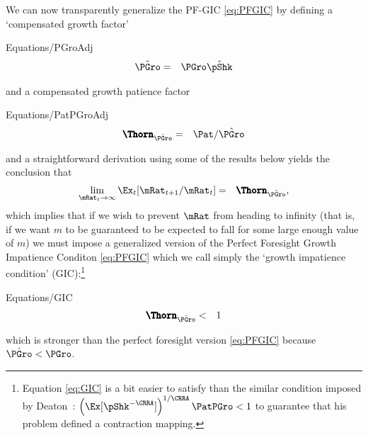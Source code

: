 \documentclass[titlepage]{\econtex}\providecommand{\texname}{BufferStockTheory}%
\providecommand{\EqDir}{Equations}
\begin{document}
\hypertarget{GIC}{}
We can now transparently generalize the PF-GIC \eqref{eq:PFGIC} by defining a `compensated growth factor'
\begin{verbatimwrite}{\EqDir/PGroAdj}
\begin{eqnarray}
  \PGroAdj & = &  \PGro \InvEpShkInv \label{eq:PGroAdj}
\end{eqnarray}
\end{verbatimwrite}

and a compensated growth patience factor\hypertarget{GIF}{}
\begin{verbatimwrite}{\EqDir/PatPGroAdj}
\begin{eqnarray}
  \PatPGroAdj & = & \Pat/\PGroAdj
\end{eqnarray}
\end{verbatimwrite}

and a straightforward derivation
using some of the results below yields the conclusion that
\begin{eqnarray*}
  \lim_{\mRat_{t} \rightarrow \infty} \Ex_{t}[\mRat_{t+1}/\mRat_{t}] & = & \PatPGroAdj,
\end{eqnarray*}
which implies that if we wish to prevent $\mRat$ from heading to infinity (that is, if we want $m$ to be guaranteed to be expected to fall for some large enough value of $m$) we must impose a generalized version of the Perfect Foresight Growth Impatience Conditon \eqref{eq:PFGIC} which we call simply the `growth impatience condition' 
(GIC):\footnote{Equation \eqref{eq:GIC} is a bit easier to satisfy than the similar condition imposed by Deaton~\citeyearpar{deatonLiqConstr}: $\left(\Ex[\pShk^{-\CRRA}]\right)^{1/\CRRA} \PatPGro < 1$ to guarantee that his problem defined a contraction mapping.}
\begin{verbatimwrite}{\EqDir/GIC}
\begin{eqnarray}
  \PatPGroAdj & < & 1 \label{eq:GIC}
\end{eqnarray}\end{verbatimwrite}

which is stronger than the perfect foresight version \eqref{eq:PFGIC} because $\PGroAdj < \PGro$.

\hypertarget{Autarky-Value}{}
\end{document}
